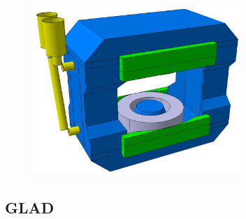 \begin{figure}[H]
\centering
\includegraphics[width=0.7\textwidth]{pictures/New_CBM_magnet.png}
\caption{}
\label{fig:NewCbmMagnet1}
\end{figure}

\subsection{GLAD}


